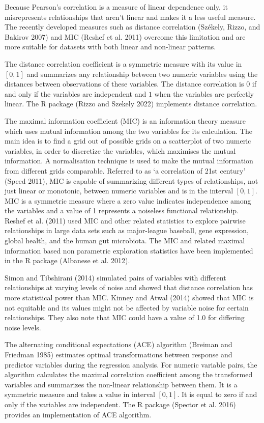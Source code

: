 Because Pearson's correlation is a measure of linear dependence only, it misrepresents relationships that aren't linear and makes it a less useful measure. The recently developed measures such as distance correlation (Székely, Rizzo, and Bakirov 2007) and MIC (Reshef et al. 2011) overcome this limitation and are more suitable for datasets with both linear and non-linear patterns.

The distance correlation coefficient is a symmetric measure with its value in \([0,1]\) and summarizes any relationship between two numeric variables using the distances between observations of these variables. The distance correlation is \(0\) if and only if the variables are independent and \(1\) when the variables are perfectly linear. The R package  (Rizzo and Szekely 2022) implements distance correlation.

The maximal information coefficient (MIC) is an information theory measure which uses mutual information among the two variables for its calculation. The main idea is to find a grid out of possible grids on a scatterplot of two numeric variables, in order to discretize the variables, which maximises the mutual information. A normalisation technique is used to make the mutual information from different grids comparable. Referred to as `a correlation of 21st century' (Speed 2011), MIC is capable of summarizing different types of relationships, not just linear or monotonic, between numeric variables and is in the interval \([0,1]\). MIC is a symmetric measure where a zero value indicates independence among the variables and a value of 1 represents a noiseless functional relationship. Reshef et al. (2011) used MIC and other related statistics to explore pairwise relationships in large data sets such as major-league baseball, gene expression, global health, and the human gut microbiota. The MIC and related maximal information based non parametric exploration statistics have been implemented in the R package  (Albanese et al. 2012).

Simon and Tibshirani (2014) simulated pairs of variables with different relationships at varying levels of noise and showed that distance correlation has more statistical power than MIC. Kinney and Atwal (2014) showed that MIC is not equitable and its values might not be affected by variable noise for certain relationships. They also note that MIC could have a value of 1.0 for differing noise levels.

The alternating conditional expectations (ACE) algorithm (Breiman and Friedman 1985) estimates optimal transformations between response and predictor variables during the regression analysis. For numeric variable pairs, the algorithm calculates the maximal correlation coefficient among the transformed variables and summarizes the non-linear relationship between them. It is a symmetric measure and takes a value in interval \([0,1]\). It is equal to zero if and only if the variables are independent. The R package  (Spector et al. 2016) provides an implementation of ACE algorithm.

